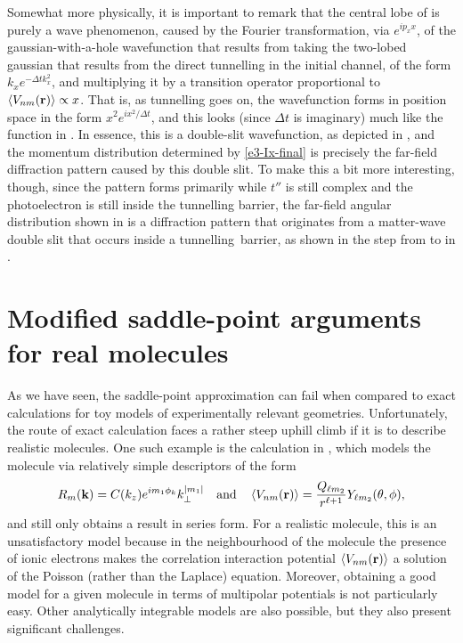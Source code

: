 Somewhat more physically, it is important to remark that the central lobe of  is purely a wave phenomenon, caused by the Fourier transformation, via $e^{ip_xx}$, of the gaussian-with-a-hole wavefunction that results from taking the two-lobed gaussian that results from the direct tunnelling in the initial channel, of the form $k_x e^{-\Delta t k_x^2}$, and multiplying it by a transition operator proportional to $\left\langle V_{nm}\mathopen{}\left( \vb{r} \right)\mathclose{} \right\rangle\propto x$. That is, as tunnelling goes on, the wavefunction forms in position space in the form $x^2 e^{ix^2/\Delta t}$, and this looks (since $\Delta t$ is imaginary) much like the function in . In essence, this is a double-slit wavefunction, as depicted in , and the momentum distribution determined by \eqref{e3-Ix-final} is precisely the far-field diffraction pattern caused by this double slit. To make this a bit more interesting, though, since the pattern forms primarily while $t''$ is still complex and the photoelectron is still inside the tunnelling barrier, the far-field angular distribution shown in  is a diffraction pattern that originates from a matter-wave double slit that occurs inside a tunnelling~barrier, as shown in the step from  to  in .









\section{Modified saddle-point arguments for real molecules}
As we have seen, the saddle-point approximation can fail when compared to exact calculations for toy models of experimentally relevant geometries. Unfortunately, the route of exact calculation faces a rather steep uphill climb if it is to describe realistic molecules. One such example is the calculation in , which models the molecule via relatively simple descriptors of the form
\begin{equation}
R_m(\vb{k})=C(k_z)e^{im_1\phi_k}k_\perp^{|m_1|}
\quad \text{and} \quad
\left\langle V_{nm}\mathopen{}\left( \vb{r} \right)\mathclose{} \right\rangle=\frac{Q_{\ell m_2}}{r^{\ell+1}}Y_{\ell m_2}(\theta, \phi)
,
\end{equation}
and still only obtains a result in series form. For a realistic molecule, this is an unsatisfactory model because in the neighbourhood of the molecule the presence of ionic electrons makes the correlation interaction potential $\left\langle V_{nm}\mathopen{}\left( \vb{r} \right)\mathclose{} \right\rangle$ a solution of the Poisson (rather than the Laplace) equation. Moreover, obtaining a good model for a given molecule in terms of multipolar potentials is not particularly easy. Other analytically integrable models are also possible, but they also present significant challenges.

